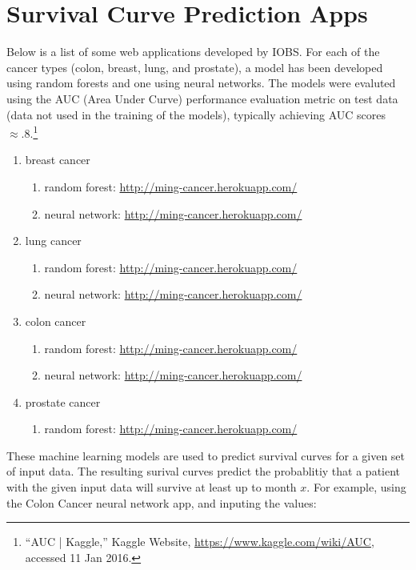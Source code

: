 \documentclass{article}
\begin{document}
\section{Survival Curve Prediction Apps}

Below is a list of some web applications developed by IOBS.
For each of the cancer types (colon, breast, lung, and prostate), a model has been developed using random forests and one using neural networks. The models were evaluted using the AUC (Area Under Curve) performance evaluation metric on test data (data not used in the training of the models), typically achieving AUC scores  $\approx .8$.\footnote{``AUC | Kaggle,'' Kaggle Website, \url{https://www.kaggle.com/wiki/AUC}, accessed 11 Jan 2016.}
 

\begin{enumerate}
\item breast cancer 
    \begin{enumerate}
    \item random forest: \url{http://ming-cancer.herokuapp.com/}
    \item neural network: \url{http://ming-cancer.herokuapp.com/}
    \end{enumerate}
\item lung cancer
   \begin{enumerate}
   \item random forest: \url{http://ming-cancer.herokuapp.com/}
   \item neural network: \url{http://ming-cancer.herokuapp.com/}
    \end{enumerate}
\item colon cancer
  \begin{enumerate}
   \item random forest: \url{http://ming-cancer.herokuapp.com/}
   \item neural network: \url{http://ming-cancer.herokuapp.com/}
   \end{enumerate}
\item prostate cancer
  \begin{enumerate}
   \item random forest: \url{http://ming-cancer.herokuapp.com/}
   \end{enumerate}
\end{enumerate}


These machine learning models are used to predict survival curves for a given set of input data. 
The resulting surival curves predict the probablitiy that a patient with the given input data will survive at least up to month $x$. For example, using the Colon Cancer neural network app, and 
inputing the values:
\end{document}
